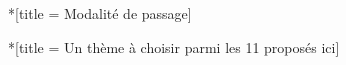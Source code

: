 \documentclass[a4paper, 14pt]{scrartcl}
\begin{document}
\exam[
	kind    = Exposés oraux "généraux",
	class   = TS-ISN,
	location = Lycée MONGE (Chambéry)
]


\exercise**[title = Modalité de passage]





\exercise**[title = Un thème à choisir parmi les 11 proposés ici]


\end{document}
